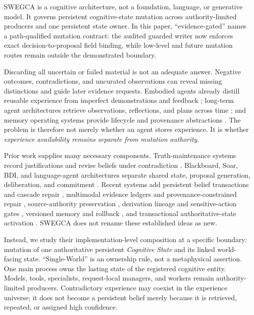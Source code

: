 \documentclass[10pt]{article}
\newcommand{\swegca}{\textsc{SWEGCA}}
\newcommand{\cstate}{\textit{Cognitive State}}
\begin{document}
\swegca{} is a cognitive architecture, not a foundation, language, or generative model. It governs persistent cognitive-state mutation across authority-limited producers and one persistent state owner. In this paper, ``evidence-gated'' names a path-qualified mutation contract: the audited guarded writer now enforces exact decision-to-proposal field binding, while low-level and future mutation routes remain outside the demonstrated boundary.

Discarding all uncertain or failed material is not an adequate answer. Negative outcomes, contradictions, and uncurated observations can reveal missing distinctions and guide later evidence requests. Embodied agents already distill reusable experience from imperfect demonstrations and feedback \cite{sarch2024ical}; long-term agent architectures retrieve observations, reflections, and plans across time \cite{park2023generative,packer2023memgpt}; and memory operating systems provide lifecycle and provenance abstractions \cite{li2025memos}. The problem is therefore not merely whether an agent stores experience. It is whether \emph{experience availability remains separate from mutation authority}.

Prior work supplies many necessary components. Truth-maintenance systems record justifications and revise beliefs under contradiction \cite{doyle1979tms,dekleer1986atms}. Blackboard, Soar, BDI, and language-agent architectures separate shared state, proposal generation, deliberation, and commitment \cite{erman1980hearsay,laird2022soar,rao1995bdi,sumers2024coala}. Recent systems add persistent belief transactions and cascade repair \cite{li2026memtx}, multimodal evidence ledgers and provenance-constrained repair \cite{du2026ledgermind}, source-authority preservation \cite{xu2026provenance,zhan2026authority}, derivation lineage and sensitive-action gates \cite{ouyang2026memlineage}, versioned memory and rollback \cite{park2026kumiho,su2026chronomem}, and transactional authoritative-state activation \cite{he2026continuity}. \swegca{} does not rename these established ideas as new.

Instead, we study their implementation-level composition at a specific boundary: mutation of one authoritative persistent \cstate{} and its linked world-facing state. ``Single-World'' is an ownership rule, not a metaphysical assertion. One main process owns the lasting state of the registered cognitive entity. Models, tools, specialists, request-local managers, and workers remain authority-limited producers. Contradictory experience may coexist in the experience universe; it does not become a persistent belief merely because it is retrieved, repeated, or assigned high confidence.
\end{document}
